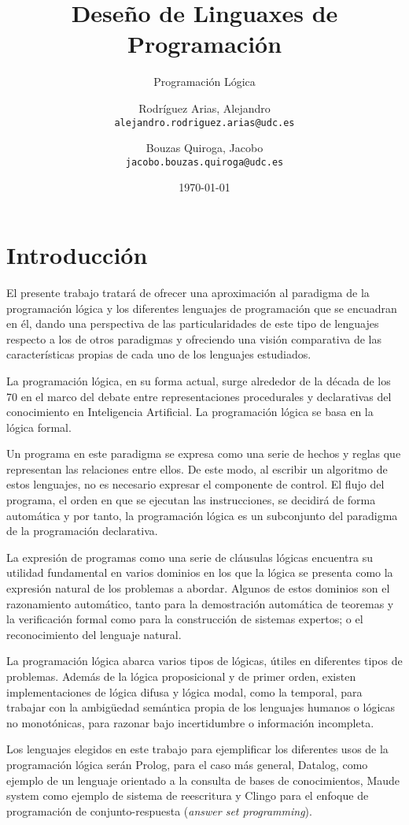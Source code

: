 \documentclass[11pt,captions=nooneline,DIV=14, parskip=full]{scrartcl}
\title{Deseño de Linguaxes de Programación}
\subtitle{Programación Lógica}
\author{Rodríguez Arias, Alejandro\\
	\texttt{alejandro.rodriguez.arias@udc.es}
	\and Bouzas Quiroga, Jacobo\\
	\texttt{jacobo.bouzas.quiroga@udc.es}}
\date{\today}
\begin{document}
\maketitle
\clearpage
\tableofcontents
\clearpage

\section{Introducción}
\label{sec:intro}

El presente trabajo tratará de ofrecer una aproximación al paradigma de la programación lógica y los diferentes lenguajes de programación que se encuadran en él, dando una perspectiva de las particularidades de este tipo de lenguajes respecto a los de otros paradigmas y ofreciendo una visión comparativa de las características propias de cada uno de los lenguajes estudiados.

La programación lógica, en su forma actual, surge alrededor de la década de los 70 en el marco del debate entre representaciones procedurales y declarativas del conocimiento en Inteligencia Artificial. La programación lógica se basa en la lógica formal.

Un programa en este paradigma se expresa como una serie de hechos y reglas que representan las relaciones entre ellos. De este modo, al escribir un algoritmo de estos lenguajes, no es necesario expresar el componente de control. El flujo del programa, el orden en que se ejecutan las instrucciones, se decidirá de forma automática y por tanto, la programación lógica es un subconjunto del paradigma de la programación declarativa.

La expresión de programas como una serie de cláusulas lógicas encuentra su utilidad fundamental en varios dominios en los que la lógica se presenta como la expresión natural de los problemas a abordar. Algunos de estos dominios son el razonamiento automático, tanto para la demostración automática de teoremas y la verificación formal como para la construcción de sistemas expertos; o el reconocimiento del lenguaje natural.

La programación lógica abarca varios tipos de lógicas, útiles en diferentes tipos de problemas. Además de la lógica proposicional y de primer orden, existen implementaciones de lógica difusa y lógica modal, como la temporal, para trabajar con la ambigüedad semántica propia de los lenguajes humanos o lógicas no monotónicas, para razonar bajo incertidumbre o información incompleta.

Los lenguajes elegidos en este trabajo para ejemplificar los diferentes usos de la programación lógica serán Prolog, para el caso más general, Datalog, como ejemplo de un lenguaje orientado a la consulta de bases de conocimientos, Maude system como ejemplo de sistema de reescritura y Clingo para el enfoque de programación de conjunto-respuesta (\textit{answer set programming}).
\end{document}
